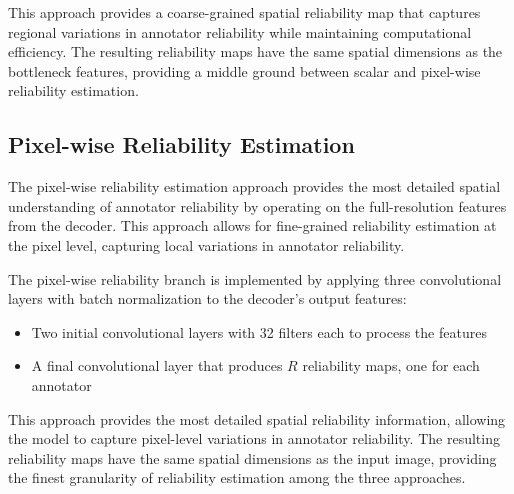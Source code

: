 This approach provides a coarse-grained spatial reliability map that captures
regional variations in annotator reliability while maintaining computational
efficiency. The resulting reliability maps have the same spatial dimensions
as the bottleneck features, providing a middle ground between scalar and
pixel-wise reliability estimation.

\subsection{Pixel-wise Reliability Estimation}

The pixel-wise reliability estimation approach provides the most detailed
spatial understanding of annotator reliability by operating on the
full-resolution
features from the decoder. This approach allows for fine-grained reliability
estimation at the pixel level, capturing local variations in annotator
reliability.

The pixel-wise reliability branch is implemented by applying three convolutional
layers with batch normalization to the decoder's output features:
\begin{itemize}
  \item Two initial convolutional layers with 32 filters each to
    process the features
  \item A final convolutional layer that produces $R$ reliability
    maps, one for each annotator
\end{itemize}

This approach provides the most detailed spatial reliability information,
allowing the model to capture pixel-level variations in annotator reliability.
The resulting reliability maps have the same spatial dimensions as the input
image, providing the finest granularity of reliability estimation among the
three approaches.
